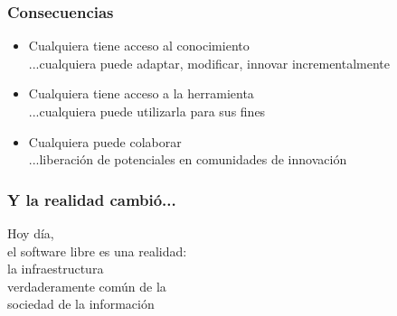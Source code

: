 \documentclass[17pt,aspectratio=169]{beamer}
\begin{document}

\begin{frame}
\frametitle{Consecuencias}

\begin{itemize}
\item Cualquiera tiene acceso al conocimiento \\
  ...cualquiera puede adaptar, modificar, innovar incrementalmente
\item Cualquiera tiene acceso a la herramienta \\
  ...cualquiera puede utilizarla para sus fines
\item Cualquiera puede colaborar \\
  ...liberación de potenciales en comunidades de innovación
\end{itemize}

\end{frame}


\begin{frame}
\frametitle{Y la realidad cambió...}

{\Large
\begin{center}
  Hoy día, \\
  el software libre es una realidad: \\
  la infraestructura \\
  verdaderamente común de la \\
  sociedad de la información \\
\end{center}
}
\end{frame}

\end{document}
